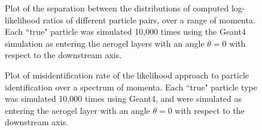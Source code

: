 \begin{figure}[]
\centering
{}
\caption[Plot of the separation between the distributions of computed log-likelihood ratios of different particle pairs, over a range of momenta. ]{Plot of the separation between the distributions of computed log-likelihood ratios of different particle pairs, over a range of momenta. Each ``true" particle was simulated 10,000 times using the Geant4 simulation as entering the aerogel layers with an angle $\theta = 0$ with respect to the downstream axis.}
\label{fig:centeredSeps} 
\end{figure}

\begin{figure}[]
\centering
{}
\caption[Plot of misidentification rate of the likelihood approach to particle identification over a spectrum of momenta.]{Plot of misidentification rate of the likelihood approach to particle identification over a spectrum of momenta. Each ``true" particle type was simulated 10,000 times using Geant4, and were simulated as entering the aerogel layer with an angle $\theta = 0$ with respect to the downstream axis.}
\label{fig:centeredMis} 
\end{figure}

